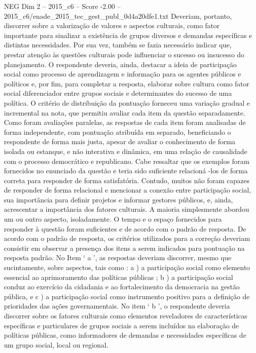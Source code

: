 \begin{textsample}{NEG Dim 2 – 2015\_c6 – Score -2.00 – 2015\_c6/enade\_2015\_tec\_gest\_publ\_0d4a20dfe1.txt}
Deveriam, portanto, discorrer sobre a valorização de valores e aspectos culturais, como fator importante para sinalizar a existência de grupos diversos e demandas específicas e distintas necessidades.
Por sua vez, também se fazia necessário indicar que, prestar atenção às questões culturais pode influenciar o sucesso ou insucesso do planejamento.
O respondente deveria, ainda, destacar a ideia de participação social como processo de aprendizagem e informação para os agentes públicos e políticos e, por fim, para completar a resposta, elaborar sobre cultura como fator social diferenciador entre grupos sociais e determinantes do sucesso de uma política.
O critério de distribuição da pontuação forneceu uma variação gradual e incremental na nota, que permitiu avaliar cada item da questão separadamente.
Como foram avaliações paralelas, as respostas de cada item foram analisadas de forma independente, com pontuação atribuída em separado, beneficiando o respondente de forma mais justa, apesar de avaliar o conhecimento de forma isolada ou estanque, e não interativa e dinâmica, em uma relação de causalidade com o processo democrático e republicano.
Cabe ressaltar que os exemplos foram fornecidos no enunciado da questão e teria sido suficiente relacioná -los de forma correta para responder de forma satisfatória.
Contudo, muitos não foram capazes de responder de forma relacional e mencionar a conexão entre participação social, sua importância para definir projetos e informar gestores públicos, e, ainda, acrescentar a importância dos fatores culturais.
A maioria simplesmente abordou um ou outro aspecto, isoladamente.
O tempo e o espaço fornecidos para responder à questão foram suficientes e de acordo com o padrão de resposta.
De acordo com o padrão de resposta, os critérios utilizados para a correção deveriam consistir em observar a presença dos itens a serem indicados para pontuação na resposta padrão.
No Item ‘ a ’, as respostas deveriam discorrer, mesmo que sucintamente, sobre aspectos, tais como : a ) a participação social como elemento essencial ao aprimoramento das políticas públicas ; b ) a participação social conduz ao exercício da cidadania e ao fortalecimento da democracia na gestão pública, e c ) a participação social como instrumento positivo para a definição de prioridades das ações governamentais.
No item ‘ b ’, o respondente deveria discorrer sobre os fatores culturais como elementos reveladores de características específicas e particulares de grupos sociais a serem incluídos na elaboração de políticas públicas, como informadores de demandas e necessidades específicas de um grupo social, local ou regional.

\end{textsample}
